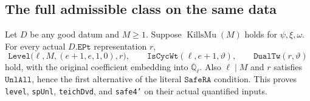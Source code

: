 \subsection{The full admissible class on the same data}

\begin{proposition}
\label{prop:ax-admissible}
Let $D$ be any good datum and $M\ge1$.  Suppose
$\operatorname{KillsMu}(M)$ holds for $\psi,\xi,\omega$.
For every actual $D.\mathtt{EPt}$ representation $r$,
\[
 \mathtt{Level}\bigl(\ell,M,(e+1,e,1,0),r\bigr),
 \qquad \mathtt{IsCycWt}(\ell,e+1,\vartheta),
 \qquad \mathtt{DualTw}(r,\vartheta)
 \tag{AX.30}
\]
hold, with the original coefficient embedding into
$\overline{\mathbb Q}_\ell$.  Also $\ell\mid M$ and
$r$ satisfies $\mathtt{UnlAll}$, hence the first alternative of
the literal $\mathtt{SafeRA}$ condition.  This proves
\texttt{level}, \texttt{spUnl}, \texttt{teichDvd}, and
\texttt{safe4'} on their actual quantified inputs.
\end{proposition}

